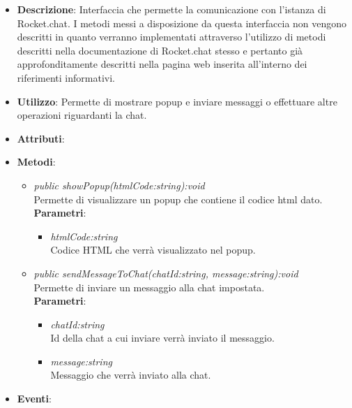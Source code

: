 \begin{itemize}
\item \textbf{Descrizione}: Interfaccia che permette la comunicazione con l'istanza di Rocket.chat.  I metodi messi a disposizione da questa interfaccia non vengono descritti in quanto verranno implementati attraverso l'utilizzo di metodi descritti nella documentazione di Rocket.chat stesso e pertanto già approfonditamente descritti nella pagina web inserita all'interno dei riferimenti informativi.
\item \textbf{Utilizzo}: Permette di mostrare popup e inviare messaggi o effettuare altre operazioni riguardanti la chat.
\item \textbf{Attributi}: 
\item \textbf{Metodi}:
	\begin{itemize}
	\item \textit{public showPopup(htmlCode:string):void}\\
	Permette di visualizzare un popup che contiene il codice html dato.
			\\\textbf{Parametri}: \begin{itemize}
			\item \textit{htmlCode:string}\\
				Codice HTML che verrà visualizzato nel popup.
			\end{itemize} 
			\item \textit{public sendMessageToChat(chatId:string, message:string):void}\\
			Permette di inviare un messaggio alla chat impostata.
			\\ \textbf{Parametri}: \begin{itemize}
			\item \textit{chatId:string}\\
			Id della chat a cui inviare verrà inviato il messaggio.
			\item \textit{message:string}\\
			Messaggio che verrà inviato alla chat.
\end{itemize} 
	\end{itemize}
\item \textbf{Eventi}:
\end{itemize}